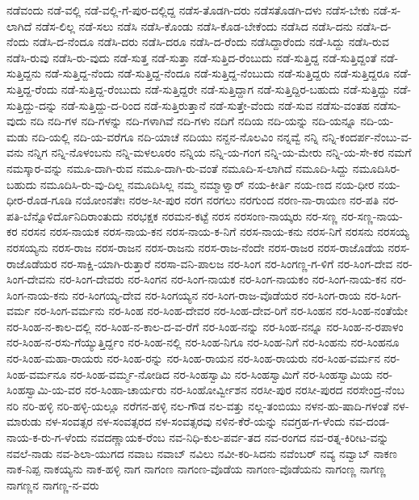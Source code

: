 {ನಡೆವಂದು
ನಡೆ-ವಲ್ಲಿ
ನಡೆ-ವಲ್ಲಿ-ಗೆ-ಪುರ-ದಲ್ಲಿದ್ದ
ನಡೆಸ-ತೊಡಗಿ-ದರು
ನಡೆಸತೊಡಗಿ-ದಳು
ನಡೆಸ-ಬೇಕು
ನಡೆ-ಸ-ಲಾಗಿದೆ
ನಡೆಸ-ಲಿಲ್ಲ
ನಡೆ-ಸಲು
ನಡೆಸಿ
ನಡೆಸಿ-ಕೊಂಡು
ನಡೆಸಿ-ಕೊಡ-ಬೇಕೆಂದು
ನಡೆಸಿದ
ನಡೆಸಿ-ದನು
ನಡೆಸಿ-ದ-ನೆಂದು
ನಡೆಸಿ-ದ-ನೆಂದೂ
ನಡೆಸಿ-ದರು
ನಡೆಸಿ-ದರೂ
ನಡೆಸಿ-ದ-ರೆಂದು
ನಡೆಸಿದ್ದಾರೆಂದು
ನಡೆ-ಸಿದ್ದು
ನಡೆಸಿ-ರುವ
ನಡೆಸಿ-ರುವು
ನಡೆಸಿ-ರು-ವುದು
ನಡೆ-ಸುತ್ತ
ನಡೆ-ಸುತ್ತಾ
ನಡೆ-ಸುತ್ತಿದ-ರೆಂಬುದು
ನಡೆ-ಸುತ್ತಿದ್ದ
ನಡೆ-ಸುತ್ತಿದ್ದಂತೆ
ನಡೆ-ಸುತ್ತಿದ್ದನು
ನಡೆ-ಸುತ್ತಿದ್ದ-ನೆಂದು
ನಡೆ-ಸುತ್ತಿದ್ದ-ನೆಂದೂ
ನಡೆ-ಸುತ್ತಿದ್ದ-ನೆಂಬುದು
ನಡೆ-ಸುತ್ತಿದ್ದರು
ನಡೆ-ಸುತ್ತಿದ್ದರೂ
ನಡೆ-ಸುತ್ತಿದ್ದ-ರೆಂದು
ನಡೆ-ಸುತ್ತಿದ್ದ-ರೆಂಬುದು
ನಡೆ-ಸುತ್ತಿದ್ದರೇ
ನಡೆ-ಸುತ್ತಿದ್ದಾಗ
ನಡೆ-ಸುತ್ತಿದ್ದಿರ-ಬಹುದು
ನಡೆ-ಸುತ್ತಿದ್ದು
ನಡೆ-ಸುತ್ತಿದ್ದು-ದನ್ನು
ನಡೆ-ಸುತ್ತಿದ್ದು-ದ-ರಿಂದ
ನಡೆ-ಸುತ್ತಿರುತ್ತಾನೆ
ನಡೆ-ಸುತ್ತೇ-ವೆಂದು
ನಡೆ-ಸುವ
ನಡೆಸು-ವಂತಹ
ನಡೆಸು-ವುದು
ನದಿ
ನದಿ-ಗಳ
ನದಿ-ಗಳನ್ನು
ನದಿ-ಗಳಾಗಿವೆ
ನದಿ-ಗಳು
ನದಿಗೆ
ನದಿಯ
ನದಿ-ಯನ್ನು
ನದಿ-ಯನ್ನೂ
ನದಿ-ಯ-ಮಡು
ನದಿ-ಯಲ್ಲಿ
ನದಿ-ಯ-ವರೆಗೂ
ನದಿ-ಯಾಚೆ
ನದಿಯು
ನನ್ದನ-ನೊಲವಿಂ
ನನ್ನವ್ವೆ
ನನ್ನಿ
ನನ್ನಿ-ಕಂದರ್ಪ-ನೆಂಬು-ವ-ವನು
ನನ್ನಿಗ
ನನ್ನಿ-ನೊಳಂಬನು
ನನ್ನಿ-ಮಳಲೂರಂ
ನನ್ನಿಯ
ನನ್ನಿ-ಯ-ಗಂಗ
ನನ್ನಿ-ಯ-ಮೇರು
ನನ್ನಿ-ಯ-ಸೇ-ಕರ
ನಮಗೆ
ನಮಸ್ಕಾರ-ವನ್ನು
ನಮೂ-ದಾಗಿ-ರುವ
ನಮೂ-ದಾಗಿ-ರು-ವಂತೆ
ನಮೂದಿ-ಸ-ಲಾಗಿದೆ
ನಮೂದಿ-ಸಿದ್ದು
ನಮೂದಿಸಿರ-ಬಹುದು
ನಮೂದಿಸಿ-ರು-ವು-ದಿಲ್ಲ
ನಮೂದಿಸಿಲ್ಲ
ನಮ್ಮ
ನಮ್ಮಾಳ್ವಾರ್
ನಯ-ಕೀರ್ತಿ
ನಯ-ಣದ
ನಯ-ಧೀರ
ನಯ-ಧೀರ-ರೊಡ-ಗೂಡಿ
ನಯೋಂನತೇಃ
ನರಅ-ಸೀ-ಪುರ
ನರಗ
ನರಗಲು
ನರಗುಂದ
ನರಣ-ನಾ-ರಾಯಣ
ನರ-ಪತಿ
ನರ-ಪತಿ-ಬೆನ್ನೊಳಿರ್ದೊನಿದಿರಾಂತುದು
ನರಭಕ್ಷಕ
ನರಮನ-ಕಟ್ಟೆ
ನರಸ
ನರಸಂಣ-ನಾಯ್ಕರು
ನರ-ಸಣ್ಣ
ನರ-ಸಣ್ಣ-ನಾಯ-ಕರ
ನರಸನ
ನರಸ-ನಾಯಕ
ನರಸ-ನಾಯ-ಕನ
ನರಸ-ನಾಯ-ಕ-ನಿಗೆ
ನರಸ-ನಾಯ-ಕನು
ನರಸ-ನಿಗೆ
ನರಸನು
ನರಸಯ್ಯ
ನರಸಯ್ಯನು
ನರಸ-ರಾಜ
ನರಸ-ರಾಜನ
ನರಸ-ರಾಜನು
ನರಸ-ರಾಜ-ನೆಂದೇ
ನರಸ-ರಾಜರ
ನರಸ-ರಾಜೊಡೆಯ
ನರಸ-ರಾಜೊಡೆಯರ
ನರ-ಸಾಕ್ಷಿ-ಯಾಗಿ-ರುತ್ತಾರೆ
ನರಸಾ-ವನಿ-ಪಾಲಜ
ನರ-ಸಿಂಗ
ನರ-ಸಿಂಗಣ್ಣ-ಗ-ಳಿಗೆ
ನರ-ಸಿಂಗ-ದೇವ
ನರ-ಸಿಂಗ-ದೇವನು
ನರ-ಸಿಂಗ-ದೇವರು
ನರ-ಸಿಂಗನ
ನರ-ಸಿಂಗ-ನಾಯಕ
ನರ-ಸಿಂಗ-ನಾಯಕಂ
ನರ-ಸಿಂಗ-ನಾಯ-ಕನ
ನರ-ಸಿಂಗ-ನಾಯ-ಕನು
ನರ-ಸಿಂಗಯ್ಯ-ದೇವ
ನರ-ಸಿಂಗಯ್ಯನ
ನರ-ಸಿಂಗ-ರಾಜ-ವೊಡೆಯರ
ನರ-ಸಿಂಗ-ರಾಯ
ನರ-ಸಿಂಗ-ವರ್ಮ
ನರ-ಸಿಂಗ-ವರ್ಮನು
ನರ-ಸಿಂಹ
ನರ-ಸಿಂಹ-ದೇವರ
ನರ-ಸಿಂಹ-ದೇವ-ರಿಗೆ
ನರ-ಸಿಂಹನ
ನರ-ಸಿಂಹ-ನಂತೆಯೇ
ನರ-ಸಿಂಹ-ನ-ಕಾಲ-ದಲ್ಲಿ
ನರ-ಸಿಂಹ-ನ-ಕಾಲ-ದ-ವ-ರೆಗೆ
ನರ-ಸಿಂಹ-ನನ್ನು
ನರ-ಸಿಂಹ-ನನ್ನೂ
ನರ-ಸಿಂಹ-ನ-ರಪಾಳಂ
ನರ-ಸಿಂಹ-ನ-ರಸು-ಗೆಯ್ಯುತ್ತಿರ್ದ್ದಂ
ನರ-ಸಿಂಹ-ನಲ್ಲಿ
ನರ-ಸಿಂಹ-ನಿಗೂ
ನರ-ಸಿಂಹ-ನಿಗೆ
ನರ-ಸಿಂಹನು
ನರ-ಸಿಂಹನೂ
ನರ-ಸಿಂಹ-ಮಹಾ-ರಾಯರು
ನರ-ಸಿಂಹ-ರನ್ನು
ನರ-ಸಿಂಹ-ರಾಯನ
ನರ-ಸಿಂಹ-ರಾಯರು
ನರ-ಸಿಂಹ-ವರ್ಮನ
ನರ-ಸಿಂಹ-ವರ್ಮನೂ
ನರ-ಸಿಂಹ-ವರ್ಮ್ಮ-ನೋಡಿದ
ನರ-ಸಿಂಹಸ್ವಾಮಿ
ನರ-ಸಿಂಹಸ್ವಾಮಿಗೆ
ನರ-ಸಿಂಹಸ್ವಾಮಿಯ
ನರ-ಸಿಂಹಸ್ವಾಮಿ-ಯ-ವರ
ನರ-ಸಿಂಹಾ-ಚಾರ್ಯರು
ನರ-ಸಿಂಹೋರ್ವ್ವೀಶನ
ನರಸೀ-ಪುರ
ನರಸೀ-ಪುರದ
ನರಸೇಂದ್ರ-ನೆಂಬ
ನರಿ
ನರಿ-ಹಳ್ಳಿ
ನರಿ-ಹಳ್ಳಿ-ಯಲ್ಲೂ
ನರೆಗನ-ಹಳ್ಳಿ
ನಲ-ಗೌಡ
ನಲ-ವತ್ತು
ನಲ್ಲ-ತಂಬಿಯು
ನಳನ-ಹು-ಷಾದಿ-ಗಳಂತೆ
ನಳ-ಮಾರುಡು
ನಳ-ಸಂವತ್ಸರ
ನಳ-ಸಂವತ್ಸರದ
ನಳ-ಸಂವತ್ಸರವು
ನಳಿನ-ಕೆರೆ-ಯನ್ನು
ನವಗ್ರಹ-ಗ-ಳೆಂದು
ನವ-ದಂಡ-ನಾಯ-ಕ-ರು-ಗ-ಳೆಂದು
ನವದಣ್ಣಾಯಕ-ರೆಂಬ
ನವ-ನಿಧಿ-ಕುಲ-ಪರ್ವ-ತದ
ನವ-ರಂಗದ
ನವ-ರತ್ನ-ಕಿರೀಟ-ವನ್ನು
ನವಲೆ-ನಾಡು
ನವ-ಶಿಲಾ-ಯುಗದ
ನವಾಬ
ನವಾಬ್
ನವಿಲು
ನವೀ-ಕರಿ-ಸಿದನು
ನವೆಂಬರ್
ನವ್ಯ
ನವ್ವಾಬ್
ನಾಕಣ
ನಾಕ-ನಿಪ್ಪ
ನಾಕಯ್ಯನು
ನಾಕ-ಹಳ್ಳಿ
ನಾಗ
ನಾಗಂಣ
ನಾಗಂಣ-ವೊಡೆಯ
ನಾಗಂಣ-ವೊಡೆಯನು
ನಾಗಂಣ್ಣ
ನಾಗಣ್ಣ
ನಾಗಣ್ಣನ
ನಾಗಣ್ಣ-ನ-ವರು
}
